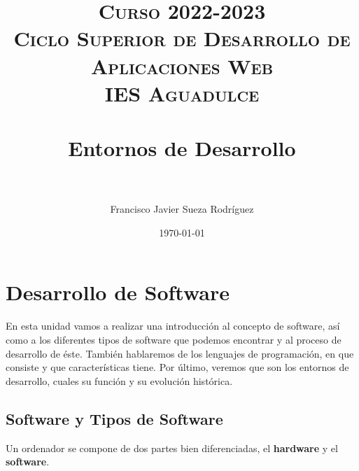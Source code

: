 


\title{
\normalfont \normalsize
\textsc{{\bfseries Curso 2022-2023} \\ Ciclo Superior de Desarrollo de Aplicaciones Web \\ IES Aguadulce} \\ [25pt]
\horrule{0.5pt} \\[0.4cm]
\huge Entornos de Desarrollo \\
\horrule{0.5pt} \\[0.4cm]
}

\author{Francisco Javier Sueza Rodríguez}
\date{\normalsize\today}

\makeglossaries
{}



\maketitle

\newpage

\tableofcontents

\listoffigures


\newpage

\chapter{Desarrollo de Software}
En esta unidad vamos a realizar una introducción al concepto de software, así como a los diferentes tipos de software que podemos encontrar y al proceso de desarrollo de éste. También hablaremos de los lenguajes de programación, en que consiste y que características tiene. Por último, veremos que son los entornos de desarrollo, cuales su función y su evolución histórica.

\section{Software y Tipos de Software}
Un ordenador se compone de dos partes bien diferenciadas, el {\bfseries hardware} y el {\bfseries software}.

